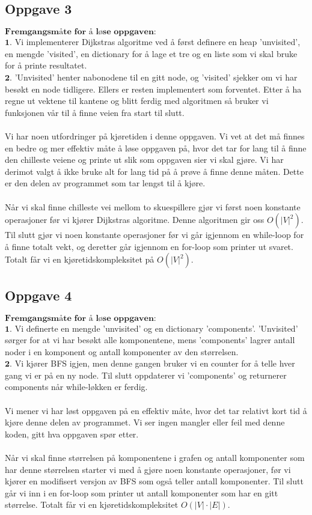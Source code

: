 \documentclass[a4paper, article, oneside, norsk]{memoir} %
\newcommand{\0}{\mathbf{0}}
\newcommand{\1}{\mathbf{1}}
\begin{document}
\subsection*{Oppgave 3}
$\textbf{Fremgangsmåte for å løse oppgaven:}$
\\
$\mathbf{1.}$ Vi implementerer Dijkstras algoritme ved å først definere en heap 'unvisited', en mengde 'visited', en dictionary for å lage et tre og en liste som vi skal bruke for å printe resultatet. 
\\
$\mathbf{2.}$ 'Unvisited' henter nabonodene til en gitt node, og 'visited' sjekker om vi har besøkt en node tidligere. Ellers er resten implementert som forventet. Etter å ha regne ut vektene til kantene og blitt ferdig med algoritmen så bruker vi funksjonen vår til å finne veien fra start til slutt.
\\
\\
Vi har noen utfordringer på kjøretiden i denne oppgaven. Vi vet at det må finnes en bedre og mer effektiv måte å løse oppgaven på, hvor det tar for lang til å finne den chilleste veiene og printe ut slik som oppgaven sier vi skal gjøre. Vi har derimot valgt å ikke bruke alt for lang tid på å prøve å finne denne måten. Dette er den delen av programmet som tar lengst til å kjøre.
\\
\\
Når vi skal finne chilleste vei mellom to skuespillere gjør vi først noen konstante operasjoner før vi kjører Dijkstras algoritme. Denne algoritmen gir oss $O(|V|^2)$. Til slutt gjør vi noen konstante operasjoner før vi går igjennom en while-loop for å finne totalt vekt, og deretter går igjennom en for-loop som printer ut svaret. Totalt får vi en kjøretidskompleksitet på $O(|V|^2)$.
\\
\subsection*{Oppgave 4}
$\textbf{Fremgangsmåte for å løse oppgaven:}$
\\
$\mathbf{1.}$ Vi definerte en mengde 'unvisited' og en dictionary 'components'. 'Unvisited' sørger for at vi har besøkt alle komponentene, mens 'components' lagrer antall noder i en komponent og antall komponenter av den størrelsen.
\\
$\mathbf{2.}$ Vi kjører BFS igjen, men denne gangen bruker vi en counter for å telle hver gang vi er på en ny node. Til slutt oppdaterer vi 'components' og returnerer components når while-løkken er ferdig.
\\
\\
Vi mener vi har løst oppgaven på en effektiv måte, hvor det tar relativt kort tid å kjøre denne delen av programmet. Vi ser ingen mangler eller feil med denne koden, gitt hva oppgaven spør etter.
\\
\\
Når vi skal finne størrelsen på komponentene i grafen og antall komponenter som har denne størrelsen starter vi med å gjøre noen konstante operasjoner, før vi kjører en modifisert versjon av BFS som også teller antall komponenter. Til slutt går vi inn i en for-loop som printer ut antall komponenter som har en gitt størrelse. Totalt får vi en kjøretidskompleksitet $O(|V| \cdot |E|)$.
\\
\end{document}
